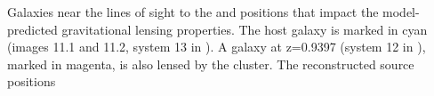 \label{fig:LineOfSightLenses}
Galaxies near the lines of sight to the \spockone and \spocktwo positions that impact the model-predicted gravitational lensing properties.   The \spock host galaxy is marked in cyan (images 11.1 and 11.2, system 13 in \citet{Caminha:2017}).  A galaxy at z=0.9397 (system 12 in \citet{Caminha:2017}), marked in magenta, is also lensed by the  cluster.  The reconstructed source positions 